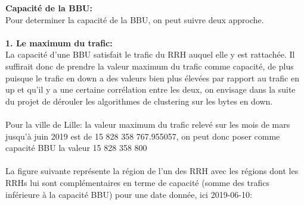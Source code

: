 \documentclass{report}
\begin{document}
\textbf{Capacité de la BBU: }\\
Pour determiner la capacité de la BBU, on peut suivre deux approche.\\\\
\textbf{1. Le maximum du trafic: }\\
La capacité d'une BBU satisfait le trafic du RRH auquel elle y est rattachée. Il suffirait donc de prendre la valeur maximum du trafic comme capacité, de plus
puisque le trafic en down a des valeurs bien plus élevées par rapport au trafic en up et qu'il y a une certaine corrélation entre les deux, on envisage dans la suite du projet de dérouler les algorithmes de clustering sur les bytes en  down.\\\\
Pour la ville de Lille: la valeur maximum du trafic relevé sur les mois de mars jusqu'à juin 2019 est de 15 828 358 767.955057, on peut donc poser comme capacité BBU la valeur 15 828 358 800\\\\
La figure suivante représente la région de l'un des RRH avec les régions dont les RRHs lui sont complémentaires en terme de capacité (somme des trafics inférieure à la capacité BBU) pour une date donnée, ici 2019-06-10:\\
\end{document}

